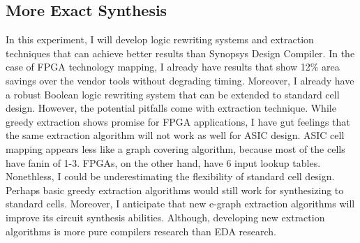 \documentclass[10pt,letterpaper]{article}
\begin{document}
\subsection{More Exact Synthesis}
In this experiment, I will develop logic rewriting systems and extraction
techniques that can achieve better results than Synopsys Design Compiler. In
the case of FPGA technology mapping, I already have results that show 12\% area
savings over the vendor tools without degrading timing. Moreover, I already
have a robust Boolean logic rewriting system that can be extended to standard
cell design. However, the potential pitfalls come with extraction technique.
While greedy extraction shows promise for FPGA applications, I have gut
feelings that the same extraction algorithm will not work as well for ASIC
design. ASIC cell mapping appears less like a graph covering algorithm, because
most of the cells have fanin of 1-3. FPGAs, on the other hand, have 6 input
lookup tables. Nonethless, I could be underestimating the flexibility of
standard cell design. Perhaps basic greedy extraction algorithms would still
work for synthesizing to standard cells. Moreover, I anticipate that new
e-graph extraction algorithms will improve its circuit synthesis abilities.
Although, developing new extraction algorithms is more pure compilers research
than EDA research.

\nocite{*}


\end{document}
